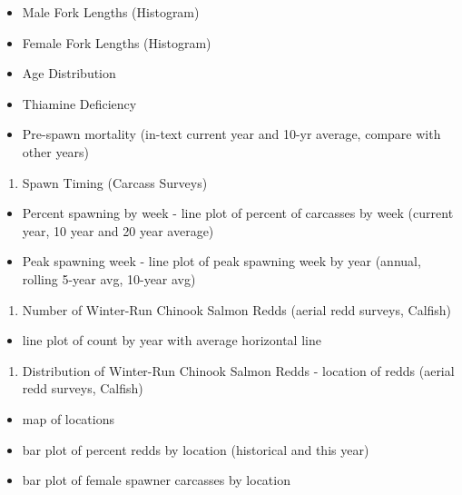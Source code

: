 \documentclass[
]{book}
\providecommand{\tightlist}{%
  \setlength{\itemsep}{0pt}\setlength{\parskip}{0pt}}
\theoremstyle{definition}
\theoremstyle{definition}
\theoremstyle{definition}
\theoremstyle{definition}
\theoremstyle{remark}
\begin{document}
\begin{itemize}
\tightlist
\item
  Male Fork Lengths (Histogram)
\item
  Female Fork Lengths (Histogram)
\item
  Age Distribution
\item
  Thiamine Deficiency
\item
  Pre-spawn mortality (in-text current year and 10-yr average, compare with other years)
\end{itemize}

\begin{enumerate}
\def\labelenumi{\arabic{enumi}.}
\setcounter{enumi}{4}
\tightlist
\item
  Spawn Timing (Carcass Surveys)
\end{enumerate}

\begin{itemize}
\tightlist
\item
  Percent spawning by week - line plot of percent of carcasses by week (current year, 10 year and 20 year average)
\item
  Peak spawning week - line plot of peak spawning week by year (annual, rolling 5-year avg, 10-year avg)
\end{itemize}

\begin{enumerate}
\def\labelenumi{\arabic{enumi}.}
\setcounter{enumi}{5}
\tightlist
\item
  Number of Winter-Run Chinook Salmon Redds (aerial redd surveys, Calfish)
\end{enumerate}

\begin{itemize}
\tightlist
\item
  line plot of count by year with average horizontal line
\end{itemize}

\begin{enumerate}
\def\labelenumi{\arabic{enumi}.}
\setcounter{enumi}{6}
\tightlist
\item
  Distribution of Winter-Run Chinook Salmon Redds - location of redds (aerial redd surveys, Calfish)
\end{enumerate}

\begin{itemize}
\tightlist
\item
  map of locations
\item
  bar plot of percent redds by location (historical and this year)
\item
  bar plot of female spawner carcasses by location
\end{itemize}
\end{document}
